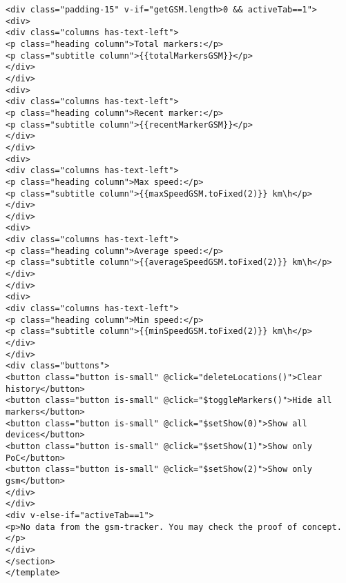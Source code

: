 \begin{verbatim}
<div class="padding-15" v-if="getGSM.length>0 && activeTab==1">
<div>
<div class="columns has-text-left">
<p class="heading column">Total markers:</p>
<p class="subtitle column">{{totalMarkersGSM}}</p>
</div>
</div>
<div>
<div class="columns has-text-left">
<p class="heading column">Recent marker:</p>
<p class="subtitle column">{{recentMarkerGSM}}</p>
</div>
</div>
<div>
<div class="columns has-text-left">
<p class="heading column">Max speed:</p>
<p class="subtitle column">{{maxSpeedGSM.toFixed(2)}} km\h</p>
</div>
</div>
<div>
<div class="columns has-text-left">
<p class="heading column">Average speed:</p>
<p class="subtitle column">{{averageSpeedGSM.toFixed(2)}} km\h</p>
</div>
</div>
<div>
<div class="columns has-text-left">
<p class="heading column">Min speed:</p>
<p class="subtitle column">{{minSpeedGSM.toFixed(2)}} km\h</p>
</div>
</div>
<div class="buttons">
<button class="button is-small" @click="deleteLocations()">Clear history</button>
<button class="button is-small" @click="$toggleMarkers()">Hide all markers</button>
<button class="button is-small" @click="$setShow(0)">Show all devices</button>
<button class="button is-small" @click="$setShow(1)">Show only PoC</button>
<button class="button is-small" @click="$setShow(2)">Show only gsm</button>
</div>
</div>
<div v-else-if="activeTab==1">
<p>No data from the gsm-tracker. You may check the proof of concept.</p>
</div>
</section>
</template>


\end{verbatim}
